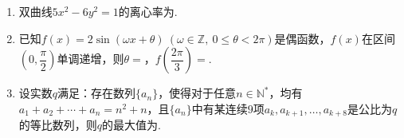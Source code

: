 \documentclass[12pt,a4paper]{article}
\begin{document}
	\vspace{0.3cm}
	
	
	\begin{enumerate}[leftmargin=*,label=\arabic*.,resume,itemsep=0.8ex]
		
		\item 双曲线$5x^2-6y^2=1$的离心率为\underline{\qquad\qquad}.
		
		\item 已知$f(x)=2\sin(\omega x+\theta)\ (\omega\in\mathbb{Z},\ 0\le\theta<2\pi)$是偶函数，$f(x)$在区间$\left(0,\dfrac{\pi}{2}\right)$单调递增，则$\theta=$\underline{\qquad\qquad}，$f\left(\dfrac{2\pi}{3}\right)=$\underline{\qquad\qquad}.
		
		\item 设实数$q$满足：存在数列$\{a_n\}$，使得对于任意$n\in\mathbb{N}^*$，均有$a_1+a_2+\cdots+a_n=n^2+n$，且$\{a_n\}$中有某连续$9$项$a_k,a_{k+1},\dots,a_{k+8}$是公比为$q$的等比数列，则$q$的最大值为\underline{\qquad\qquad}.
		
	\end{enumerate}
	
	\vspace{0.3cm}
	
	
\end{document}
